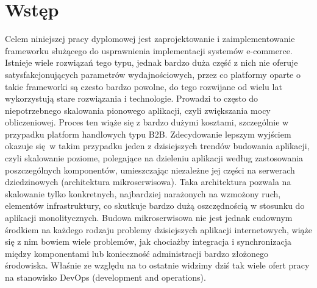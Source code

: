 \chapter{Wstęp}
\thispagestyle{chapterBeginStyle}
Celem niniejszej pracy dyplomowej jest zaprojektowanie i zaimplementowanie frameworku służącego do usprawnienia implementacji systemów e-commerce. Istnieje wiele rozwiązań tego typu, jednak bardzo duża część z nich nie oferuje satysfakcjonujących parametrów wydajnościowych, przez co platformy oparte o takie frameworki są czesto bardzo powolne, do tego rozwijane od wielu lat wykorzystują stare rozwiązania i technologie. Prowadzi to często do niepotrzebnego skalowania pionowego aplikacji, czyli zwiększania mocy obliczeniowej. Proces ten wiąże się z bardzo dużymi kosztami, szczególnie w przypadku platform handlowych typu B2B. Zdecydowanie lepszym wyjściem okazuje się w takim przypadku jeden z dzisiejszych trendów budowania aplikacji, czyli skalowanie poziome, polegające na dzieleniu aplikacji według zastosowania poszczególnych komponentów, umieszczając niezależne jej części na serwerach dziedzinowych (architektura mikroserwisowa). Taka architektura pozwala na skalowanie tylko konkretnych, najbardziej narażonych na wzmożony ruch, elementów infrastruktury, co skutkuje bardzo dużą oszczędnością w stosunku do aplikacji monolitycznych. Budowa mikroserwisowa nie jest jednak cudownym środkiem na każdego rodzaju problemy dzisiejszych aplikacji internetowych, wiąże się z nim bowiem wiele problemów, jak chociażby integracja i synchronizacja między komponentami lub konieczność administracji bardzo złożonego środowiska. Właśnie ze względu na to ostatnie widzimy dziś tak wiele ofert pracy na stanowisko DevOps (development and operations). 
\newline

